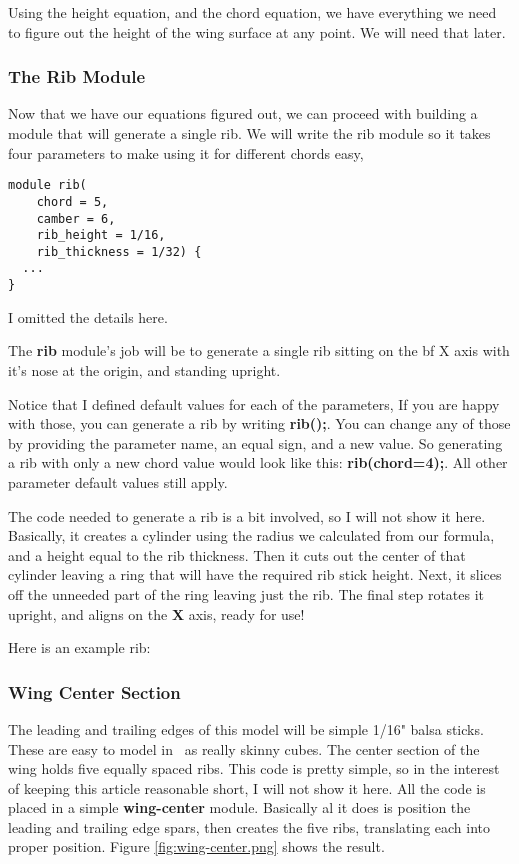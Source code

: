 Using the height equation, and the chord equation, we have everything we need
to figure out the height of the wing surface at any point. We will need  that
later.

\subsubsection{The Rib Module}

Now that we have our equations figured out, we can proceed with building a
module that will generate a single rib. We will write the rib module so it
takes four parameters to make using it for different chords easy,

\begin{lstlisting}
module rib(
    chord = 5,
    camber = 6,
    rib_height = 1/16,
    rib_thickness = 1/32) {
  ...
}
\end{lstlisting}

I omitted the details here.

The {\bf rib} module's job will be to generate a single rib sitting on the {bf X} axis
with it's nose at the origin, and standing upright.

Notice that I defined  default values for each of the parameters, If you are
happy with those, you can generate a rib by writing {\bf rib();}. You can
change any of those by providing the parameter name, an equal sign, and a new
value. So generating a rib with only a new chord value would look like this:
{\bf rib(chord=4);}. All other parameter default values still apply.

The code needed to generate a rib is a bit involved, so I will not show it
here. Basically, it creates a cylinder using the radius we calculated from our
formula, and a height equal to the rib thickness.  Then it cuts out the center
of that cylinder leaving a ring that will have the required rib stick height.
Next, it slices off the unneeded part of the ring leaving just the rib. The
final step rotates it upright, and aligns on the {\bf X} axis, ready for use!

Here is an example rib:


\subsubsection{Wing Center Section}

The leading and trailing edges of this model will be simple 1/16" balsa sticks.
These are easy to model in \osc\ as really skinny cubes. The center section of
the wing holds five equally spaced ribs. This code is pretty simple, so in the
interest of keeping this article reasonable short, I will not show it here. All
the code is placed in a simple {\bf wing-center} module. Basically al it does
is position the leading and trailing edge spars, then creates the five ribs,
translating each into proper position. Figure \ref{fig:wing-center.png} shows the
result.

